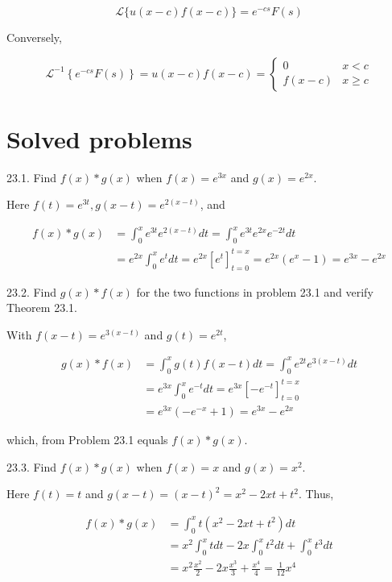 \documentclass[10pt]{article}
\begin{document}
$$
\mathscr{L}\{u(x-c) f(x-c)\}=e^{-c s} F(s)
$$

Conversely,

$$
\mathscr{L}^{-1}\left\{e^{-c s} F(s)\right\}=u(x-c) f(x-c)=\left\{\begin{array}{cc}
0 & x<c \\
f(x-c) & x \geq c
\end{array}\right.
$$

\section*{Solved problems}
23.1. Find $f(x) * g(x)$ when $f(x)=e^{3 x}$ and $g(x)=e^{2 x}$.

Here $f(t)=e^{3 t}, g(x-t)=e^{2(x-t)}$, and

$$
\begin{aligned}
f(x) * g(x) & =\int_{0}^{x} e^{3 t} e^{2(x-t)} d t=\int_{0}^{x} e^{3 t} e^{2 x} e^{-2 t} d t \\
& =e^{2 x} \int_{0}^{x} e^{t} d t=e^{2 x}\left[e^{t}\right]_{t=0}^{t=x}=e^{2 x}\left(e^{x}-1\right)=e^{3 x}-e^{2 x}
\end{aligned}
$$

23.2. Find $g(x) * f(x)$ for the two functions in problem 23.1 and verify Theorem 23.1.

With $f(x-t)=e^{3(x-t)}$ and $g(t)=e^{2 t}$,

$$
\begin{aligned}
g(x) * f(x) & =\int_{0}^{x} g(t) f(x-t) d t=\int_{0}^{x} e^{2 t} e^{3(x-t)} d t \\
& =e^{3 x} \int_{0}^{x} e^{-t} d t=e^{3 x}\left[-e^{-t}\right]_{t=0}^{t=x} \\
& =e^{3 x}\left(-e^{-x}+1\right)=e^{3 x}-e^{2 x}
\end{aligned}
$$

which, from Problem 23.1 equals $f(x) * g(x)$.

23.3. Find $f(x) * g(x)$ when $f(x)=x$ and $g(x)=x^{2}$.

Here $f(t)=t$ and $g(x-t)=(x-t)^{2}=x^{2}-2 x t+t^{2}$. Thus,

$$
\begin{aligned}
f(x) * g(x) & =\int_{0}^{x} t\left(x^{2}-2 x t+t^{2}\right) d t \\
& =x^{2} \int_{0}^{x} t d t-2 x \int_{0}^{x} t^{2} d t+\int_{0}^{x} t^{3} d t \\
& =x^{2} \frac{x^{2}}{2}-2 x \frac{x^{3}}{3}+\frac{x^{4}}{4}=\frac{1}{12} x^{4}
\end{aligned}
$$
\end{document}
